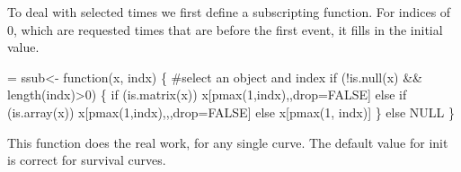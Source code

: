 \documentclass{article}
\begin{document}
To deal with selected times we first define a subscripting function.
For indices of 0, which are requested times that are before the first event,
it fills in the initial value. 

\begin{nwchunk}
=
 ssub<- function(x, indx) \{  #select an object and index
     if (!is.null(x) && length(indx)>0) \{
         if (is.matrix(x)) x[pmax(1,indx),,drop=FALSE]
         else if (is.array(x))  x[pmax(1,indx),,,drop=FALSE]
         else x[pmax(1, indx)]
     \}
     else NULL
 \}
\end{nwchunk}

This function does the real work, for any single curve.
The default value for init is correct for survival curves.
\end{document}

